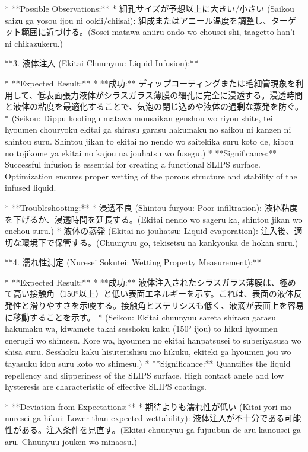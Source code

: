 \documentclass{article}
\begin{document}
*   **Possible Observations:**
    *   細孔サイズが予想以上に大きい/小さい (Saikou saizu ga yosou ijou ni ookii/chiisai): 組成またはアニール温度を調整し、ターゲット範囲に近づける。(Sosei matawa aniiru ondo wo chousei shi, taagetto han'i ni chikazukeru.)

**3. 液体注入 (Ekitai Chuunyuu: Liquid Infusion):**

*   **Expected Result:**
    *   **成功:** ディップコーティングまたは毛細管現象を利用して、低表面張力液体がシラスガラス薄膜の細孔に完全に浸透する。浸透時間と液体の粘度を最適化することで、気泡の閉じ込めや液体の過剰な蒸発を防ぐ。
    *   (Seikou: Dippu kootingu matawa mousaikan genshou wo riyou shite, tei hyoumen chouryoku ekitai ga shirasu garasu hakumaku no saikou ni kanzen ni shintou suru. Shintou jikan to ekitai no nendo wo saitekika suru koto de, kibou no tojikome ya ekitai no kajou na jouhatsu wo fusegu.)
    *   **Significance:**  Successful infusion is essential for creating a functional SLIPS surface. Optimization ensures proper wetting of the porous structure and stability of the infused liquid.

*   **Troubleshooting:**
    *   浸透不良 (Shintou furyou: Poor infiltration): 液体粘度を下げるか、浸透時間を延長する。(Ekitai nendo wo sageru ka, shintou jikan wo enchou suru.)
    *   液体の蒸発 (Ekitai no jouhatsu: Liquid evaporation): 注入後、適切な環境下で保管する。(Chuunyuu go, tekisetsu na kankyouka de hokan suru.)

**4. 濡れ性測定 (Nuresei Sokutei: Wetting Property Measurement):**

*   **Expected Result:**
    *   **成功:** 液体注入されたシラスガラス薄膜は、極めて高い接触角（150°以上）と低い表面エネルギーを示す。これは、表面の液体反発性と滑りやすさを示唆する。接触角ヒステリシスも低く、液滴が表面上を容易に移動することを示す。
    *   (Seikou: Ekitai chuunyuu sareta shirasu garasu hakumaku wa, kiwamete takai sesshoku kaku (150° ijou) to hikui hyoumen enerugii wo shimesu. Kore wa, hyoumen no ekitai hanpatsusei to suberiyasusa wo shisa suru. Sesshoku kaku hisuterishisu mo hikuku, ekiteki ga hyoumen jou wo tayasuku idou suru koto wo shimesu.)
    *   **Significance:**  Quantifies the liquid repellency and slipperiness of the SLIPS surface. High contact angle and low hysteresis are characteristic of effective SLIPS coatings.

*   **Deviation from Expectations:**
    *   期待よりも濡れ性が低い (Kitai yori mo nuresei ga hikui: Lower than expected wettability):  液体注入が不十分である可能性がある。注入条件を見直す。(Ekitai chuunyuu ga fujuubun de aru kanousei ga aru. Chuunyuu jouken wo minaosu.)
\end{document}
